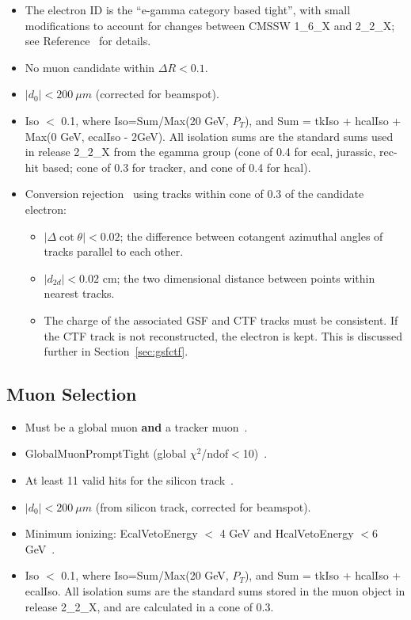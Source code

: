 \begin{itemize}
\item The electron ID is the ``e-gamma category based tight'', with small 
modifications to account for changes between CMSSW 1\_6\_X and 2\_2\_X; see Reference~\cite{ww} for details.
\item No muon candidate within $\Delta R < 0.1$.
\item $|d_0| < 200~\mu m$ (corrected for beamspot).
\item Iso $<$ 0.1, where Iso=Sum/Max(20 GeV, $P_T$), and Sum = tkIso + hcalIso +  Max(0 GeV, ecalIso - 2GeV).
All isolation sums are the standard sums used in release 2\_2\_X from the egamma group (cone of
0.4 for ecal, jurassic, rec-hit based; cone of 0.3 for tracker, and cone of 0.4 for hcal).
\item Conversion rejection~\cite{conversion} using tracks within cone of 0.3 of the candidate electron: 
\begin{itemize}
\item $|\Delta \cot\theta| < 0.02$; the difference between cotangent azimuthal angles of tracks parallel to 
each other.
\item $|d_{2d}| < 0.02$ cm; the two dimensional distance between points within nearest tracks.
\item The charge of the associated GSF and CTF tracks must be consistent.
If the CTF track is not reconstructed, the electron is kept.
This is discussed further in Section~\ref{sec:gsfctf}.
\end{itemize} 
\end{itemize}

\subsection{Muon Selection}
\label{sec:muon}
\begin{itemize}
\item Must be a global muon {\bf and} a tracker muon~\cite{glbtrk}.
\item GlobalMuonPromptTight (global $\chi^2$/ndof$<$10)~\cite{muonid}.
\item At least 11 valid hits for the silicon track~\cite{muonid}.
\item $|d_0| < 200~\mu m$ (from silicon track, corrected for beamspot).
\item Minimum ionizing: EcalVetoEnergy $<$ 4 GeV and HcalVetoEnergy $<6$ GeV~\cite{vplusj}. 
\item Iso $<$ 0.1, where Iso=Sum/Max(20 GeV, $P_T$), and Sum = tkIso + hcalIso +  ecalIso.
All isolation sums are the standard sums stored in the muon object in release 2\_2\_X, and
are calculated in a cone of 0.3.
\end{itemize}

